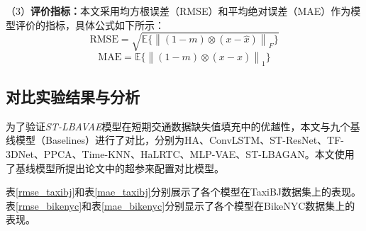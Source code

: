 （3）\textbf{评价指标：}本文采用均方根误差（RMSE）和平均绝对误差（MAE）作为模型评价的指标，具体公式如下所示：
\begin{equation}
\mathrm{RMSE}=\sqrt{\mathbb{E}\big \{ \left\|(1-m) \otimes \left(x-\hat{x}\right)\right\|_{F} \big \}}
\end{equation}
\begin{equation}
\mathrm{MAE}=\mathbb{E}\big \{ \left\|(1-m) \otimes \left(x-\hat{x}\right)\right\|_{1} \big \}
\end{equation}

\subsection{对比实验结果与分析}
为了验证\textit{ST-LBAVAE}模型在短期交通数据缺失值填充中的优越性，本文与九个基线模型（Baselines）进行了对比，分别为HA、ConvLSTM\cite{shi2015convolutional}、ST-ResNet\cite{zhang2017deep}、TF-3DNet\cite{yu20193d}、PPCA\cite{qu2009ppca}、Time-KNN、HaLRTC\cite{ran2016tensor}、MLP-VAE\cite{boquet2019missing}、ST-LBAGAN\cite{yang2021st}。本文使用了基线模型所提出论文中的超参来配置对比模型。

表\ref{rmse_taxibj}和表\ref{mae_taxibj}分别展示了各个模型在TaxiBJ数据集上的表现。表\ref{rmse_bikenyc}和表\ref{mae_bikenyc}分别显示了各个模型在BikeNYC数据集上的表现。

